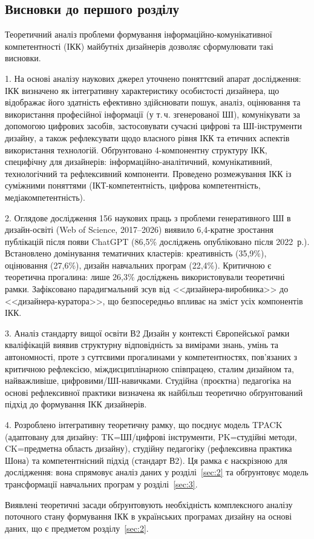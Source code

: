 \subsection*{Висновки до першого розділу}

Теоретичний аналіз проблеми формування інформаційно-комунікативної компетентності (ІКК) майбутніх дизайнерів дозволяє сформулювати такі висновки.

1. На основі аналізу наукових джерел уточнено поняттєвий апарат дослідження: ІКК визначено як інтегративну характеристику особистості дизайнера, що відображає його здатність ефективно здійснювати пошук, аналіз, оцінювання та використання професійної інформації (у т.\,ч. згенерованої ШІ), комунікувати за допомогою цифрових засобів, застосовувати сучасні цифрові та ШІ-інструменти дизайну, а також рефлексувати щодо власного рівня ІКК та етичних аспектів використання технологій. Обґрунтовано 4-компонентну структуру ІКК, специфічну для дизайнерів: інформаційно-аналітичний, комунікативний, технологічний та рефлексивний компоненти. Проведено розмежування ІКК із суміжними поняттями (ІКТ-компетентність, цифрова компетентність, медіакомпетентність).

2. Оглядове дослідження 156 наукових праць з проблеми генеративного ШІ в дизайн-освіті (Web of Science, 2017--2026) виявило 6,4-кратне зростання публікацій після появи ChatGPT (86,5\% досліджень опубліковано після 2022~р.). Встановлено домінування тематичних кластерів: креативність (35,9\%), оцінювання (27,6\%), дизайн навчальних програм (22,4\%). Критичною є теоретична прогалина: лише 26,3\% досліджень використовували теоретичні рамки. Зафіксовано парадигмальний зсув від <<дизайнера-виробника>> до <<дизайнера-куратора>>, що безпосередньо впливає на зміст усіх компонентів ІКК.

3. Аналіз стандарту вищої освіти В2 Дизайн у контексті Європейської рамки кваліфікацій виявив структурну відповідність за вимірами знань, умінь та автономності, проте з суттєвими прогалинами у компетентностях, пов'язаних з критичною рефлексією, міждисциплінарною співпрацею, сталим дизайном та, найважливіше, цифровими/ШІ-навичками. Студійна (проєктна) педагогіка на основі рефлексивної практики визначена як найбільш теоретично обґрунтований підхід до формування ІКК дизайнерів.

4. Розроблено інтегративну теоретичну рамку, що поєднує модель TPACK (адаптовану для дизайну: TK=ШІ/цифрові інструменти, PK=студійні методи, CK=предметна область дизайну), студійну педагогіку (рефлексивна практика Шона) та компетентнісний підхід (стандарт В2). Ця рамка є наскрізною для дослідження: вона спрямовує аналіз даних у розділі~\ref{sec:2} та обґрунтовує модель трансформації навчальних програм у розділі~\ref{sec:3}.

Виявлені теоретичні засади обґрунтовують необхідність комплексного аналізу поточного стану формування ІКК в українських програмах дизайну на основі даних, що є предметом розділу~\ref{sec:2}.
